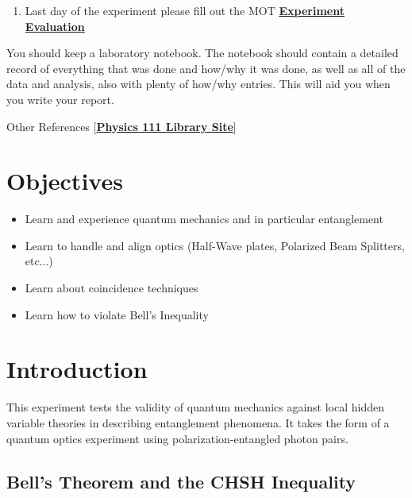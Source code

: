 \documentclass{../lab}
\begin{document}
\begin{enumerate}
    \item Last day of the experiment please fill out the MOT  \href{\ExperimentEvaluation}{\textbf{Experiment Evaluation}}

\end{enumerate}

You should keep a laboratory notebook. The notebook should contain a detailed record of everything that was done and how/why it was done, as well as all of the data and analysis, also with plenty of how/why entries. This will aid you when you write your report.

Other References [\href{http://physics111.lib.berkeley.edu/Physics111/Reprints/QIE/QIE\_index.html}{\textbf{Physics 111 Library Site}}]

\section{Objectives}

\begin{itemize}
    \item Learn and experience quantum mechanics and in particular entanglement

    \item Learn to handle and align optics (Half-Wave plates, Polarized Beam Splitters, etc...)

    \item Learn about coincidence techniques

    \item Learn how to violate Bell's Inequality

\end{itemize}

\section{Introduction}
\label{sec:Introduction}

This experiment tests the validity of quantum mechanics against local hidden variable theories in describing entanglement phenomena. It takes the form of a quantum optics experiment using polarization-entangled photon pairs.

\subsection{Bell's Theorem and the CHSH Inequality}
\end{document}

